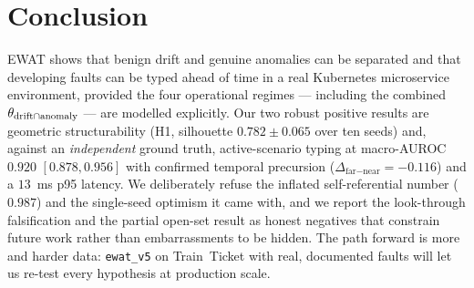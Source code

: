 \section{Conclusion}
\label{sec:conclusion}

EWAT shows that benign drift and genuine anomalies can be separated and that developing faults can
be typed ahead of time in a real Kubernetes microservice environment, provided the four operational
regimes --- including the combined $\theta_{\text{drift}\cap\text{anomaly}}$ --- are modelled explicitly. Our two robust positive
results are geometric structurability (H1, silhouette $0.782\pm0.065$ over ten seeds) and, against
an \emph{independent} ground truth, active-scenario typing at macro-AUROC $0.920$ $[0.878,0.956]$
with confirmed temporal precursion ($\Delta_{\text{far}-\text{near}}=-0.116$) and a $13$~ms p95
latency. We deliberately refuse the inflated self-referential number ($0.987$) and the
single-seed optimism it came with, and we report the look-through falsification and the partial
open-set result as honest negatives that constrain future work rather than embarrassments to be
hidden. The path forward is more and harder data: \texttt{ewat\_v5} on Train~Ticket with real,
documented faults will let us re-test every hypothesis at production scale.
